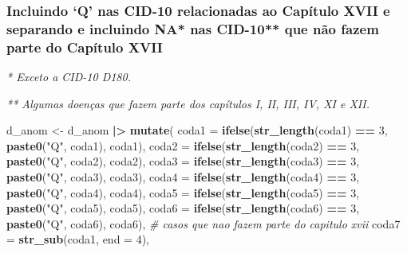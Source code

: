 \documentclass[
]{article}
\newenvironment{Shaded}{\begin{snugshade}}{\end{snugshade}}
\newcommand{\AttributeTok}[1]{\textcolor[rgb]{0.13,0.29,0.53}{#1}}
\newcommand{\CommentTok}[1]{\textcolor[rgb]{0.56,0.35,0.01}{\textit{#1}}}
\newcommand{\DecValTok}[1]{\textcolor[rgb]{0.00,0.00,0.81}{#1}}
\newcommand{\FunctionTok}[1]{\textcolor[rgb]{0.13,0.29,0.53}{\textbf{#1}}}
\newcommand{\NormalTok}[1]{#1}
\newcommand{\OtherTok}[1]{\textcolor[rgb]{0.56,0.35,0.01}{#1}}
\newcommand{\SpecialCharTok}[1]{\textcolor[rgb]{0.81,0.36,0.00}{\textbf{#1}}}
\newcommand{\StringTok}[1]{\textcolor[rgb]{0.31,0.60,0.02}{#1}}
\begin{document}
\hypertarget{incluindo-q-nas-cid-10-relacionadas-ao-capuxedtulo-xvii-e-separando-e-incluindo-na-nas-cid-10-que-nuxe3o-fazem-parte-do-capuxedtulo-xvii}{%
\subsubsection{Incluindo `Q' nas CID-10 relacionadas ao Capítulo XVII e
separando e incluindo NA* nas CID-10** que não fazem parte do Capítulo
XVII}\label{incluindo-q-nas-cid-10-relacionadas-ao-capuxedtulo-xvii-e-separando-e-incluindo-na-nas-cid-10-que-nuxe3o-fazem-parte-do-capuxedtulo-xvii}}

\emph{* Exceto a CID-10 D180.}

\emph{** Algumas doenças que fazem parte dos capítulos I, II, III, IV,
XI e XII.}

\begin{Shaded}
\begin{Highlighting}[]
\NormalTok{d\_anom }\OtherTok{\textless{}{-}}\NormalTok{ d\_anom }\SpecialCharTok{|\textgreater{}} 
  \FunctionTok{mutate}\NormalTok{(}
    \AttributeTok{coda1 =} \FunctionTok{ifelse}\NormalTok{(}\FunctionTok{str\_length}\NormalTok{(coda1) }\SpecialCharTok{==} \DecValTok{3}\NormalTok{, }\FunctionTok{paste0}\NormalTok{(}\StringTok{"Q"}\NormalTok{, coda1), coda1),}
    \AttributeTok{coda2 =} \FunctionTok{ifelse}\NormalTok{(}\FunctionTok{str\_length}\NormalTok{(coda2) }\SpecialCharTok{==} \DecValTok{3}\NormalTok{, }\FunctionTok{paste0}\NormalTok{(}\StringTok{"Q"}\NormalTok{, coda2), coda2),}
    \AttributeTok{coda3 =} \FunctionTok{ifelse}\NormalTok{(}\FunctionTok{str\_length}\NormalTok{(coda3) }\SpecialCharTok{==} \DecValTok{3}\NormalTok{, }\FunctionTok{paste0}\NormalTok{(}\StringTok{"Q"}\NormalTok{, coda3), coda3),}
    \AttributeTok{coda4 =} \FunctionTok{ifelse}\NormalTok{(}\FunctionTok{str\_length}\NormalTok{(coda4) }\SpecialCharTok{==} \DecValTok{3}\NormalTok{, }\FunctionTok{paste0}\NormalTok{(}\StringTok{"Q"}\NormalTok{, coda4), coda4),}
    \AttributeTok{coda5 =} \FunctionTok{ifelse}\NormalTok{(}\FunctionTok{str\_length}\NormalTok{(coda5) }\SpecialCharTok{==} \DecValTok{3}\NormalTok{, }\FunctionTok{paste0}\NormalTok{(}\StringTok{"Q"}\NormalTok{, coda5), coda5),}
    \AttributeTok{coda6 =} \FunctionTok{ifelse}\NormalTok{(}\FunctionTok{str\_length}\NormalTok{(coda6) }\SpecialCharTok{==} \DecValTok{3}\NormalTok{, }\FunctionTok{paste0}\NormalTok{(}\StringTok{"Q"}\NormalTok{, coda6), coda6),}
    \CommentTok{\# casos que nao fazem parte do capitulo xvii}
    \AttributeTok{coda7 =} \FunctionTok{str\_sub}\NormalTok{(coda1, }\AttributeTok{end =} \DecValTok{4}\NormalTok{),}

\end{Highlighting}
\end{Shaded}
\end{document}
